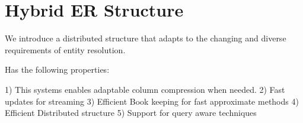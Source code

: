
\section{Hybrid ER Structure}


% 



We introduce a distributed structure that adapts to the changing and diverse requirements 
of entity resolution.

Has the following properties:

1) This systems enables adaptable column compression when needed.
2) Fast updates for streaming 
3) Efficient Book keeping for fast approximate methods
4) Efficient Distributed structure
5) Support for query aware techniques




